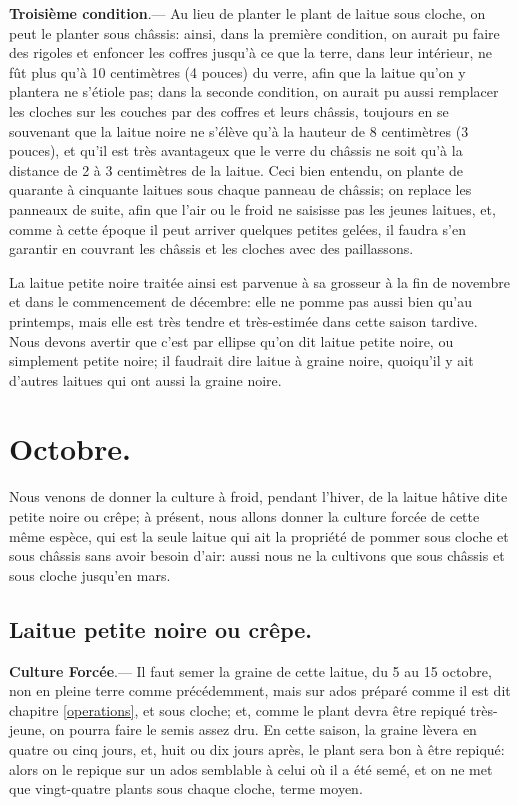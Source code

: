 \documentclass[10pt,a4paper]{book}
\begin{document}
\textbf{Troisième condition}.--- Au lieu de planter le plant de laitue sous cloche, on peut le planter sous châssis: ainsi, dans la première condition, on aurait pu faire des rigoles et enfoncer les coffres jusqu'à ce que la terre, dans leur intérieur, ne fût plus qu'à 10 centimètres (4 pouces) du verre, afin que la laitue qu'on y plantera ne s'étiole pas; dans la seconde condition, on aurait pu aussi remplacer les cloches sur les couches par des coffres et leurs châssis, toujours en se souvenant que la laitue noire ne s'élève qu'à la hauteur de 8 centimètres (3 pouces), et qu'il est très avantageux que le verre du châssis ne soit qu'à la distance de 2 à 3 centimètres de la laitue. Ceci bien entendu, on plante de quarante à cinquante laitues sous chaque panneau de châssis; on replace les panneaux de suite, afin que l'air ou le froid ne saisisse pas les jeunes laitues, et, comme à cette époque il peut arriver quelques petites gelées, il faudra s'en garantir en couvrant les châssis et les cloches avec des paillassons.

La laitue petite noire traitée ainsi est parvenue à sa grosseur à la fin de novembre et dans le commencement de décembre: elle ne pomme pas aussi bien qu'au printemps, mais elle est très tendre et très-estimée dans cette saison tardive. Nous devons avertir que c'est par ellipse qu'on dit laitue petite noire, ou simplement petite noire; il faudrait dire laitue à graine noire, quoiqu'il y ait d'autres laitues qui ont aussi la graine noire.

\section{Octobre.}

Nous venons de donner la culture à froid, pendant l'hiver, de la laitue hâtive dite petite noire ou crêpe; à présent, nous allons donner la culture forcée de cette même espèce, qui est la seule laitue qui ait la propriété de pommer sous cloche et sous châssis sans avoir besoin d'air: aussi nous ne la cultivons que sous châssis et sous cloche jusqu'en mars.

\subsection{Laitue petite noire ou crêpe.}

\textbf{Culture Forcée}.--- Il faut semer la graine de cette laitue, du 5 au 15 octobre, non en pleine terre comme précédemment, mais sur ados préparé comme il est dit chapitre \ref{operations}, et sous cloche; et, comme le plant devra être repiqué très-jeune, on pourra faire le semis assez dru. En cette saison, la graine lèvera en quatre ou cinq jours, et, huit ou dix jours après, le plant sera bon à être repiqué: alors on le repique sur un ados semblable à celui où il a été semé, et on ne met que vingt-quatre plants sous chaque cloche, terme moyen.
\end{document}
